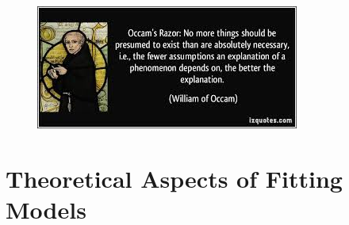 \documentclass[PredictiveAnalytics101.tex]{subfiles}
\begin{document}
\begin{frame}
	\begin{figure}
\centering
\includegraphics[width=0.99\linewidth]{images/occamrazor}


\end{figure}

\end{frame}

\section{Theoretical Aspects of Fitting Models}
\end{document}
